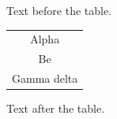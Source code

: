\documentclass[12pt]{article}
\begin{document}
Text before the table.

\begin{tabular}{c}Alpha\\Be\\Gamma delta\end{tabular}

Text after the table.
\end{document}
